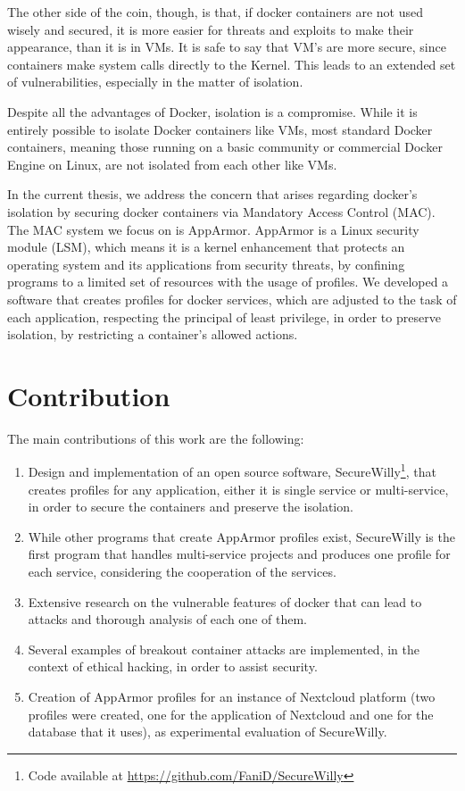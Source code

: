 The other side of the coin, though, is that, if docker containers are not used wisely and secured, it is more easier for threats and exploits to make their appearance, than it is in VMs. It is safe to say that VM's are more secure, since containers make system calls directly to the Kernel. This leads to an extended set of vulnerabilities, especially in the matter of isolation.

Despite all the advantages of Docker, isolation is a compromise. While it is entirely possible to isolate Docker containers like VMs, most standard Docker containers, meaning those running on a basic community or commercial Docker Engine on Linux, are not isolated from each other like VMs.

In the current thesis, we address the concern that arises regarding docker's isolation by securing docker containers via Mandatory Access Control (MAC). The MAC system we focus on is AppArmor. AppArmor is a Linux security module (LSM), which means it is a kernel enhancement that protects an operating system and its applications from security threats, by confining programs to a limited set of resources with the usage of profiles. We developed a software that creates profiles for docker services, which are adjusted to the task of each application, respecting the principal of least privilege, in order to preserve isolation, by restricting a container's allowed actions.

\section{Contribution}
The main contributions of this work are the following:
\begin{enumerate}
\item Design and implementation of an open source software, SecureWilly\footnote{Code available at \url{https://github.com/FaniD/SecureWilly}}, that creates profiles for any application, either it is single service or multi-service, in order to secure the containers and preserve the isolation.
\item While other programs that create AppArmor profiles exist, SecureWilly is the first program that handles multi-service projects and produces one profile for each service, considering the cooperation of the services.
\item Extensive research on the vulnerable features of docker that can lead to attacks and thorough analysis of each one of them.
\item Several examples of breakout container attacks are implemented, in the context of ethical hacking, in order to assist security.
\item Creation of AppArmor profiles for an instance of Nextcloud platform (two profiles were created, one for the application of Nextcloud and one for the database that it uses), as experimental evaluation of SecureWilly.
\end{enumerate}

